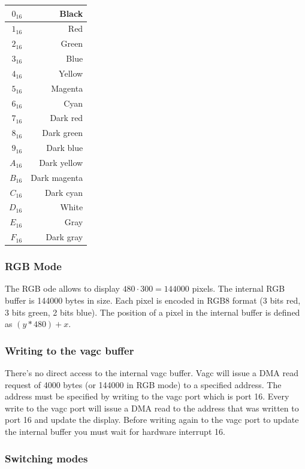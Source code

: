 \begin{tabular}{| r | r |}
	\hline
	$0_{16}$ & Black \\
	\hline
	$1_{16}$ & Red \\
	\hline
	$2_{16}$ & Green \\
	\hline
	$3_{16}$ & Blue \\
	\hline
	$4_{16}$ & Yellow \\
	\hline
	$5_{16}$ & Magenta \\
	\hline
	$6_{16}$ & Cyan \\
	\hline
	$7_{16}$ & Dark red \\
	\hline
	$8_{16}$ & Dark green \\
	\hline
	$9_{16}$ & Dark blue \\
	\hline
	$A_{16}$ & Dark yellow \\
	\hline
	$B_{16}$ & Dark magenta \\
	\hline
	$C_{16}$ & Dark cyan \\
	\hline
	$D_{16}$ & White \\
	\hline
	$E_{16}$ & Gray \\
	\hline
	$F_{16}$ & Dark gray \\
	\hline
\end{tabular}

\subsubsection{RGB Mode}

The RGB ode allows to display $480 \cdot 300 = 144000$ pixels. The internal RGB buffer is 144000 bytes in size. Each pixel is encoded in RGB8 format (3 bits red, 3 bits green, 2 bits blue). The position of a pixel in the internal buffer is defined as $(y * 480) + x$. 

\subsubsection{Writing to the vagc buffer}

There's no direct access to the internal vagc buffer. Vagc will issue a DMA read request of 4000 bytes (or 144000 in RGB mode) to a specified address. The address must be specified by writing to the vagc port which is port 16. Every write to the vagc port will issue a DMA read to the address that was written to port 16 and update the display.
Before writing again to the vagc port to update the internal buffer you must wait for hardware interrupt 16. 

\subsubsection{Switching modes}


